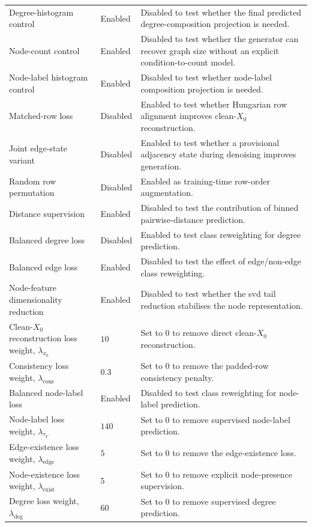 \begin{xltabular}{\textwidth}{@{}p{0.34\textwidth}p{0.24\textwidth}X@{}}
Degree-histogram control & Enabled & Disabled to test whether the final predicted degree-composition projection is needed. \\
Node-count control & Enabled & Disabled to test whether the generator can recover graph size without an explicit condition-to-count model. \\
Node-label histogram control & Enabled & Disabled to test whether node-label composition projection is needed. \\
Matched-row loss & Disabled & Enabled to test whether Hungarian row alignment improves clean-\(X_0\) reconstruction. \\
Joint edge-state variant & Disabled & Enabled to test whether a provisional adjacency state during denoising improves generation. \\
Random row permutation & Disabled & Enabled as training-time row-order augmentation. \\
Distance supervision & Enabled & Disabled to test the contribution of binned pairwise-distance prediction. \\
Balanced degree loss & Disabled & Enabled to test class reweighting for degree prediction. \\
Balanced edge loss & Enabled & Disabled to test the effect of edge/non-edge class reweighting. \\
Node-feature dimensionality reduction & Enabled & Disabled to test whether the \gls{svd} tail reduction stabilises the node representation. \\
Clean-\(X_0\) reconstruction loss weight, \(\lambda_{x_0}\) & \(10\) & Set to \(0\) to remove direct clean-\(X_0\) reconstruction. \\
Consistency loss weight, \(\lambda_{\mathrm{cons}}\) & \(0.3\) & Set to \(0\) to remove the padded-row consistency penalty. \\
Balanced node-label loss & Enabled & Disabled to test class reweighting for node-label prediction. \\
Node-label loss weight, \(\lambda_{\tau_V}\) & \(140\) & Set to \(0\) to remove supervised node-label prediction. \\
Edge-existence loss weight, \(\lambda_{\mathrm{edge}}\) & \(5\) & Set to \(0\) to remove the edge-existence loss. \\
Node-existence loss weight, \(\lambda_{\mathrm{exist}}\) & \(5\) & Set to \(0\) to remove explicit node-presence supervision. \\
Degree loss weight, \(\lambda_{\mathrm{deg}}\) & \(60\) & Set to \(0\) to remove supervised degree prediction. \\

\end{xltabular}
